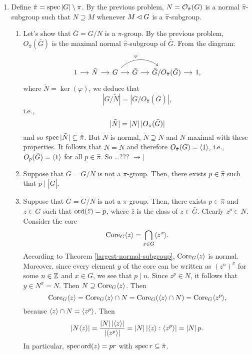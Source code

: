 \begin{solution}
\begin{enumerate}[\rm a)]
    \item Define $\hat\pi=\operatorname{spec}\left\vert{G}\right\vert\setminus\pi$. By the previous problem, $N={\cal O}_{\hat\pi}(G)$ is a normal $\hat\pi$-subgroup such that $N\supseteq M$ whenever $M\lhd G$ is a $\hat\pi$-subgroup.

    \begin{enumerate}[$\to\!\!|$]
        \item Let's show that $\bar G=G/N$ is a $\pi$-group. By the previous problem, $O_{\hat\pi}(\bar G)$ is the maximal normal $\hat\pi$-subgroup of $\bar G$. From the diagram:
        $$
            \begin{tikzcd}[column sep=small]
                1\arrow[r]&\tilde N\arrow[r]
                    &G\vphantom/\arrow[rr,"\varphi",bend left=40]\arrow[r]
                    &\bar G\arrow[r]
                    &\bar G/O_{\hat\pi}(\bar G)\arrow[r]
                    &1,
            \end{tikzcd}
        $$
        where $\tilde N=\ker(\varphi)$, we deduce that
        $$
            |G/\tilde N|=|\bar G/O_{\hat\pi}(\bar G)|,
        $$
        i.e.,
        $$
            |\tilde N|=\left\vert{N}\right\vert|O_{\hat\pi}(\bar G)|
        $$
        and so $\operatorname{spec}|\tilde N|\subseteq\hat\pi$. But $\tilde N$ is normal, $\tilde N\supseteq N$ and $N$ maximal with these properties. It follows that $N=\tilde N$ and therefore $O_{\hat\pi}(\bar G)=\langle1\rangle$, i.e., $O_p(\bar G)=\langle1\rangle$ for all $p\in\hat\pi$. So \dots??? $\to\!\!|$

        \item Suppose that $\bar G=G/N$ is not a $\pi$-group. Then, there exists $p\in\hat\pi$ such that $p\mid|\bar G|$. 

        \item Suppose that $\bar G=G/N$ is not a $\pi$-group. Then, there exists $p\in\hat\pi$ and $z\in G$ such that ${\rm ord}(\bar z)=p$, where $\bar z$ is the class of $z\in\bar G$. Clearly $z^p\in N$. Consider the core
        $$
            {\rm Core}_G\langle z\rangle = \bigcap_{x\in G}\langle z^x\rangle.
        $$
        According to Theorem \ref{largest-normal-subgroup}, ${\rm Core}_G\langle z\rangle$ is normal. Moreover, since every element $y$ of the core can be written as $(z^n)^x$ for some $n\in\mathbb{Z}$ and $x\in G$, we see that $p\mid n$. Since $z^p\in N$, it follows that $y\in N^x=N$. Then $N\supseteq{\rm Core}_G\langle z\rangle$. Then
        $$
            {\rm Core}_G\langle z\rangle={\rm Core}_G\langle z\rangle\cap N={\rm Core}_G(\langle z\rangle\cap N)={\rm Core}_G\langle z^p\rangle,
        $$
        because $\langle z\rangle\cap N=\langle z^p\rangle$. Then
        $$
            \left\vert{N\langle z\rangle}\right\vert=\frac{\left\vert{N}\right\vert\left\vert{\langle z\rangle}\right\vert}{|\langle z^p\rangle|}
                =\left\vert{N}\right\vert|\langle z\rangle:\langle z^p\rangle|=\left\vert{N}\right\vert p.
        $$
        In particular, $\operatorname{spec}{\rm ord}(z)=pr$ with $\operatorname{spec}r\subseteq\hat\pi$.
    

\end{enumerate}
\end{enumerate}
\end{solution}
